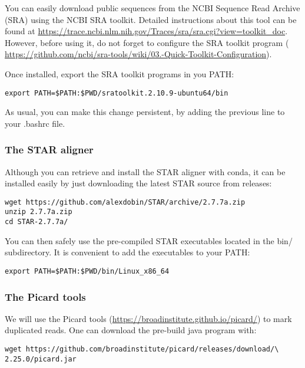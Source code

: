 You can easily download public sequences from the NCBI Sequence Read Archive (SRA) using the NCBI SRA toolkit. Detailed instructions about this tool can be found at \href{https://trace.ncbi.nlm.nih.gov/Traces/sra/sra.cgi?view=toolkit_doc}{https://trace.ncbi.nlm.nih.gov/Traces/sra/sra.cgi?view=toolkit\_doc}. However, before using it, do not forget to configure the SRA toolkit program ( \href{https://github.com/ncbi/sra-tools/wiki/03.-Quick-Toolkit-Configuration}{https://github.com/ncbi/sra-tools/wiki/03.-Quick-Toolkit-Configuration}).


Once installed, export the SRA toolkit programs in you PATH:

\begin{verbatim}
export PATH=$PATH:$PWD/sratoolkit.2.10.9-ubuntu64/bin
\end{verbatim}

As usual, you can make this change persistent, by adding the previous line to your .bashrc file.


\subsubsection{The STAR aligner}

Although you can retrieve and install the STAR aligner with conda, it can be installed easily by just downloading the latest STAR source from releases:

\begin{verbatim} 
wget https://github.com/alexdobin/STAR/archive/2.7.7a.zip
unzip 2.7.7a.zip
cd STAR-2.7.7a/
\end{verbatim}

You can then safely use the pre-compiled STAR executables located in the bin/ subdirectory. It is convenient to add the executables to your PATH:

\begin{verbatim}
export PATH=$PATH:$PWD/bin/Linux_x86_64
\end{verbatim}



\subsubsection{The Picard tools}

We will use the Picard tools (\href{https://broadinstitute.github.io/picard/}{https://broadinstitute.github.io/picard/}) to mark duplicated reads. One can download the pre-build java program with:

\begin{verbatim}
wget https://github.com/broadinstitute/picard/releases/download/\
2.25.0/picard.jar
\end{verbatim}

